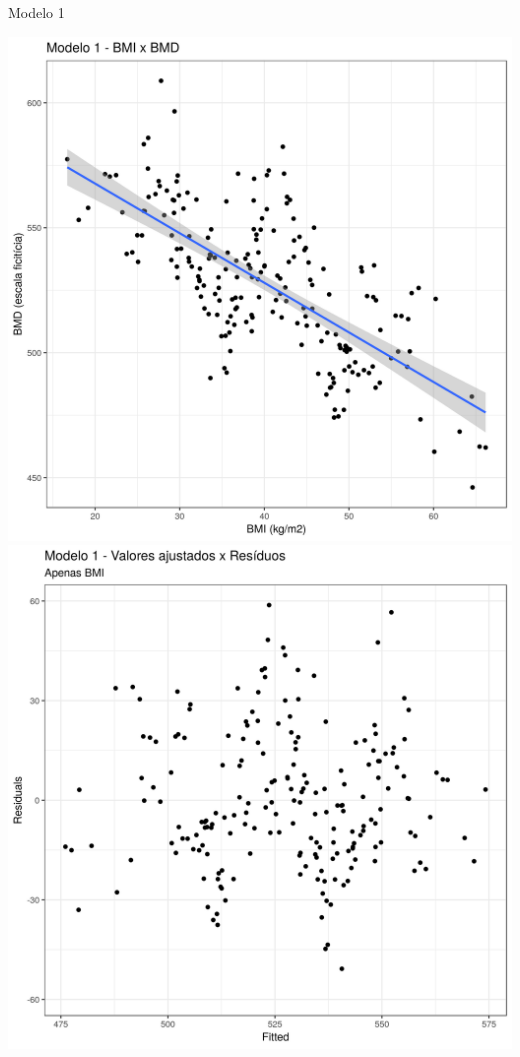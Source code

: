 \documentclass{beamer}
\begin{document}
\begin{frame}{\scriptsize Modelo 1}
  \begin{center}
    \includegraphics[height=.6\textheight]{Cap31-32/pratica-rlm1}
    \includegraphics[height=.6\textheight]{Cap31-32/pratica-rlm1-resid}
\end{center}
\end{frame}
\end{document}
